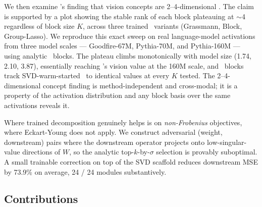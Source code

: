 We then examine \bsf's finding that vision concepts are 2--4-dimensional \citep{goodfire2026bsf}. The claim is supported by a plot showing the stable rank of each block plateauing at $\sim$4 regardless of block size $K$, across three trained \bsf\ variants (Grassmann, Block, Group-Lasso). We reproduce this exact sweep on real language-model activations from three model scales --- Goodfire-67M, Pythia-70M, and Pythia-160M \citep{biderman2023pythia} --- using analytic \svdomp\ blocks. The plateau climbs monotonically with model size (1.74, 2.10, 3.87), essentially reaching \bsf's vision value at the 160M scale, and \svdomp\ blocks track SVD-warm-started \bsf\ to identical values at every $K$ tested. The 2--4-dimensional concept finding is method-independent and cross-modal; it is a property of the activation distribution and any block basis over the same activations reveals it.

Where trained decomposition genuinely helps is on \emph{non-Frobenius} objectives, where Eckart-Young does not apply. We construct adversarial (weight, downstream) pairs where the downstream operator projects onto low-singular-value directions of $W$, so the analytic top-$k$-by-$\sigma$ selection is provably suboptimal. A small trainable correction on top of the SVD scaffold reduces downstream MSE by 73.9\% on average, 24 / 24 modules substantively.

\subsection{Contributions}

